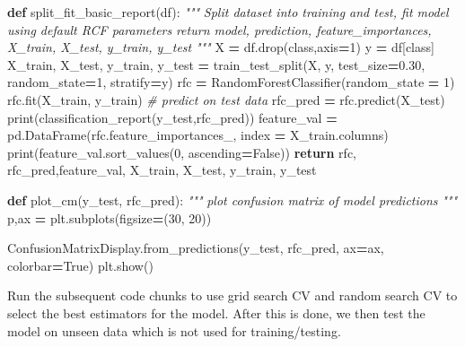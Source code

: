 \documentclass[
]{article}
\newenvironment{Shaded}{\begin{snugshade}}{\end{snugshade}}
\newcommand{\BuiltInTok}[1]{#1}
\newcommand{\CommentTok}[1]{\textcolor[rgb]{0.56,0.35,0.01}{\textit{#1}}}
\newcommand{\ControlFlowTok}[1]{\textcolor[rgb]{0.13,0.29,0.53}{\textbf{#1}}}
\newcommand{\DecValTok}[1]{\textcolor[rgb]{0.00,0.00,0.81}{#1}}
\newcommand{\FloatTok}[1]{\textcolor[rgb]{0.00,0.00,0.81}{#1}}
\newcommand{\KeywordTok}[1]{\textcolor[rgb]{0.13,0.29,0.53}{\textbf{#1}}}
\newcommand{\NormalTok}[1]{#1}
\newcommand{\OperatorTok}[1]{\textcolor[rgb]{0.81,0.36,0.00}{\textbf{#1}}}
\newcommand{\StringTok}[1]{\textcolor[rgb]{0.31,0.60,0.02}{#1}}
\newcommand{\VariableTok}[1]{\textcolor[rgb]{0.00,0.00,0.00}{#1}}
\begin{document}
\begin{Shaded}
\begin{Highlighting}[]
\KeywordTok{def}\NormalTok{ split\_fit\_basic\_report(df):}
    \CommentTok{"""}
\CommentTok{    Split dataset into training and test, fit model using default RCF parameters}
\CommentTok{    return model, prediction, feature\_importances, X\_train, X\_test, y\_train, y\_test}
\CommentTok{    """}
\NormalTok{    X }\OperatorTok{=}\NormalTok{ df.drop(}\StringTok{\textquotesingle{}class\textquotesingle{}}\NormalTok{,axis}\OperatorTok{=}\DecValTok{1}\NormalTok{)}
\NormalTok{    y }\OperatorTok{=}\NormalTok{ df[}\StringTok{\textquotesingle{}class\textquotesingle{}}\NormalTok{] }
\NormalTok{    X\_train, X\_test, y\_train, y\_test }\OperatorTok{=}\NormalTok{ train\_test\_split(X, y, test\_size}\OperatorTok{=}\FloatTok{0.30}\NormalTok{, random\_state}\OperatorTok{=}\DecValTok{1}\NormalTok{, stratify}\OperatorTok{=}\NormalTok{y)}
\NormalTok{    rfc }\OperatorTok{=}\NormalTok{ RandomForestClassifier(random\_state }\OperatorTok{=} \DecValTok{1}\NormalTok{)}
\NormalTok{    rfc.fit(X\_train, y\_train)}
    \CommentTok{\# predict on test data}
\NormalTok{    rfc\_pred }\OperatorTok{=}\NormalTok{ rfc.predict(X\_test)}
    \BuiltInTok{print}\NormalTok{(classification\_report(y\_test,rfc\_pred))}
\NormalTok{    feature\_val }\OperatorTok{=}\NormalTok{ pd.DataFrame(rfc.feature\_importances\_, index }\OperatorTok{=}\NormalTok{ X\_train.columns)}
    \BuiltInTok{print}\NormalTok{(feature\_val.sort\_values(}\DecValTok{0}\NormalTok{, ascending}\OperatorTok{=}\VariableTok{False}\NormalTok{))}
    \ControlFlowTok{return}\NormalTok{ rfc, rfc\_pred,feature\_val,  X\_train, X\_test, y\_train, y\_test}

\KeywordTok{def}\NormalTok{ plot\_cm(y\_test, rfc\_pred):}
    \CommentTok{"""}
\CommentTok{    plot confusion matrix of model predictions}
\CommentTok{    """}
\NormalTok{    p,ax }\OperatorTok{=}\NormalTok{ plt.subplots(figsize}\OperatorTok{=}\NormalTok{(}\DecValTok{30}\NormalTok{, }\DecValTok{20}\NormalTok{))}

\NormalTok{    ConfusionMatrixDisplay.from\_predictions(y\_test, rfc\_pred, ax}\OperatorTok{=}\NormalTok{ax, colorbar}\OperatorTok{=}\VariableTok{True}\NormalTok{)}
\NormalTok{    plt.show()}
\end{Highlighting}
\end{Shaded}

Run the subsequent code chunks to use grid search CV and random search CV to select the best estimators for the model. After this is done, we then test the model on unseen data which is not used for training/testing.
\end{document}
